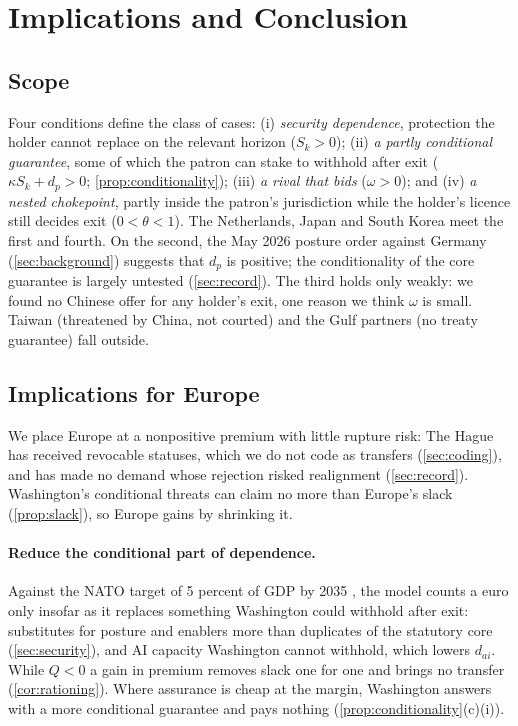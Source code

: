 \section{Implications and Conclusion}\label{sec:conclusion}

\subsection{Scope}\label{sec:scope}

Four conditions define the class of cases: (i) \emph{security dependence}, protection the holder cannot replace on the relevant horizon ($S_k>0$); (ii) \emph{a partly conditional guarantee}, some of which the patron can stake to withhold after exit ($\kappa S_k+d_p>0$; \cref{prop:conditionality}); (iii) \emph{a rival that bids} ($\omega>0$); and (iv) \emph{a nested chokepoint}, partly inside the patron's jurisdiction while the holder's licence still decides exit ($0<\theta<1$). The Netherlands, Japan and South Korea meet the first and fourth. On the second, the May 2026 posture order against Germany (\cref{sec:background}) suggests that $d_p$ is positive; the conditionality of the core guarantee is largely untested (\cref{sec:record}). The third holds only weakly: we found no Chinese offer for any holder's exit, one reason we think $\omega$ is small. Taiwan (threatened by China, not courted) and the Gulf partners (no treaty guarantee) fall outside.

\subsection{Implications for Europe}\label{sec:implications}

We place Europe at a nonpositive premium with little rupture risk: The Hague has received revocable statuses, which we do not code as transfers (\cref{sec:coding}), and has made no demand whose rejection risked realignment (\cref{sec:record}). Washington's conditional threats can claim no more than Europe's slack (\cref{prop:slack}), so Europe gains by shrinking it.

\paragraph{Reduce the conditional part of dependence.} Against the NATO target of 5 percent of GDP by 2035 \citep{nato2025hague}, the model counts a euro only insofar as it replaces something Washington could withhold after exit: substitutes for posture and enablers more than duplicates of the statutory core (\cref{sec:security}), and AI capacity Washington cannot withhold, which lowers $d_{ai}$. While $Q<0$ a gain in premium removes slack one for one and brings no transfer (\cref{cor:rationing}). Where assurance is cheap at the margin, Washington answers with a more conditional guarantee and pays nothing (\cref{prop:conditionality}(c)(i)).


